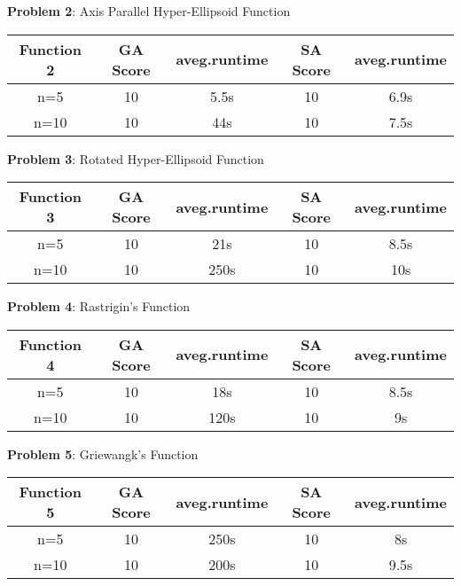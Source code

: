 \documentclass{article}
\begin{document}
\textbf{Problem 2}: Axis Parallel Hyper-Ellipsoid Function\\
\begin{center}
\begin{tabular}{ |c|c|c|c|c| } 
\hline
Function 2 & GA Score & aveg.runtime & SA Score & aveg.runtime \\
\hline
\multirow{1}{3em}{n=5}
& 10 & 5.5s & 10 & 6.9s \\ 
\hline
\multirow{1}{3em}{n=10}
& 10 & 44s & 10 & 7.5s \\ 
\hline
\end{tabular}
\end{center}

\textbf{Problem 3}: Rotated Hyper-Ellipsoid Function\\
\begin{center}
\begin{tabular}{ |c|c|c|c|c| } 
\hline
Function 3 & GA Score & aveg.runtime & SA Score & aveg.runtime \\
\hline
\multirow{1}{3em}{n=5}
& 10 & 21s & 10 & 8.5s \\ 
\hline
\multirow{1}{3em}{n=10}
& 10 & 250s & 10 & 10s \\ 
\hline
\end{tabular}
\end{center}

\textbf{Problem 4}: Rastrigin's Function\\
\begin{center}
\begin{tabular}{ |c|c|c|c|c| } 
\hline
Function 4 & GA Score & aveg.runtime & SA Score & aveg.runtime \\
\hline
\multirow{1}{3em}{n=5}
& 10 & 18s & 10 & 8.5s \\ 
\hline
\multirow{1}{3em}{n=10}
& 10 & 120s & 10 & 9s \\ 
\hline
\end{tabular}
\end{center}

\textbf{Problem 5}: Griewangk's Function\\
\begin{center}
\begin{tabular}{ |c|c|c|c|c| } 
\hline
Function 5 & GA Score & aveg.runtime & SA Score & aveg.runtime \\
\hline
\multirow{1}{3em}{n=5}
& 10 & 250s & 10 & 8s \\ 
\hline
\multirow{1}{3em}{n=10}
& 10 & 200s & 10 & 9.5s \\ 
\hline
\end{tabular}
\end{center}
\end{document}
